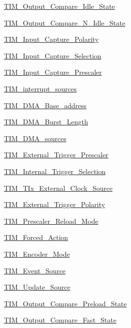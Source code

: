 \begin{DoxyCompactItemize}
\item 
\hyperlink{group__TIM__Output__Compare__Idle__State}{TIM\_\-Output\_\-Compare\_\-Idle\_\-State}
\item 
\hyperlink{group__TIM__Output__Compare__N__Idle__State}{TIM\_\-Output\_\-Compare\_\-N\_\-Idle\_\-State}
\item 
\hyperlink{group__TIM__Input__Capture__Polarity}{TIM\_\-Input\_\-Capture\_\-Polarity}
\item 
\hyperlink{group__TIM__Input__Capture__Selection}{TIM\_\-Input\_\-Capture\_\-Selection}
\item 
\hyperlink{group__TIM__Input__Capture__Prescaler}{TIM\_\-Input\_\-Capture\_\-Prescaler}
\item 
\hyperlink{group__TIM__interrupt__sources}{TIM\_\-interrupt\_\-sources}
\item 
\hyperlink{group__TIM__DMA__Base__address}{TIM\_\-DMA\_\-Base\_\-address}
\item 
\hyperlink{group__TIM__DMA__Burst__Length}{TIM\_\-DMA\_\-Burst\_\-Length}
\item 
\hyperlink{group__TIM__DMA__sources}{TIM\_\-DMA\_\-sources}
\item 
\hyperlink{group__TIM__External__Trigger__Prescaler}{TIM\_\-External\_\-Trigger\_\-Prescaler}
\item 
\hyperlink{group__TIM__Internal__Trigger__Selection}{TIM\_\-Internal\_\-Trigger\_\-Selection}
\item 
\hyperlink{group__TIM__TIx__External__Clock__Source}{TIM\_\-TIx\_\-External\_\-Clock\_\-Source}
\item 
\hyperlink{group__TIM__External__Trigger__Polarity}{TIM\_\-External\_\-Trigger\_\-Polarity}
\item 
\hyperlink{group__TIM__Prescaler__Reload__Mode}{TIM\_\-Prescaler\_\-Reload\_\-Mode}
\item 
\hyperlink{group__TIM__Forced__Action}{TIM\_\-Forced\_\-Action}
\item 
\hyperlink{group__TIM__Encoder__Mode}{TIM\_\-Encoder\_\-Mode}
\item 
\hyperlink{group__TIM__Event__Source}{TIM\_\-Event\_\-Source}
\item 
\hyperlink{group__TIM__Update__Source}{TIM\_\-Update\_\-Source}
\item 
\hyperlink{group__TIM__Output__Compare__Preload__State}{TIM\_\-Output\_\-Compare\_\-Preload\_\-State}
\item 
\hyperlink{group__TIM__Output__Compare__Fast__State}{TIM\_\-Output\_\-Compare\_\-Fast\_\-State}
\item 

\end{DoxyCompactItemize}
